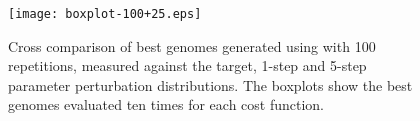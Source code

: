 \begin{figure}[th!]
  \centering
  \texttt{[image: boxplot-100+25.eps]}\\
  \caption{Cross comparison of best genomes generated using {\GA} with
    100 repetitions, measured against the target, 1-step and 5-step
    parameter perturbation distributions.  The boxplots show the best
    genomes evaluated ten times for each cost
    function. }\label{fig:GA:BestGenome100+25}
\end{figure}



% 
% 
% 
% 
% 
